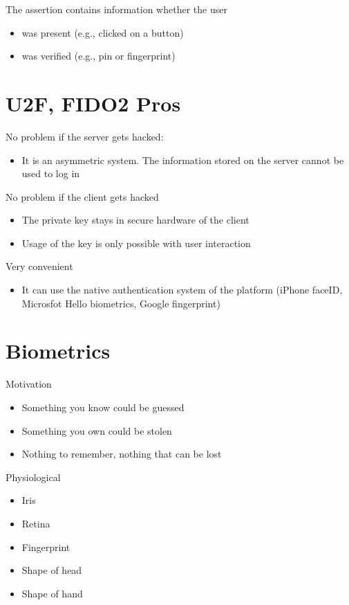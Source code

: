 \documentclass[11pt]{article}
\begin{document}
The assertion contains information whether the user

\begin{itemize}
	\item was present (e.g., clicked on a button)
	\item was verified (e.g., pin or fingerprint)
\end{itemize}

\section*{U2F, FIDO2 Pros}

No problem if the server gets hacked:

\begin{itemize}
	\item It is an asymmetric system. The information stored on the server cannot be used to log in
\end{itemize}

No problem if the client gets hacked 

\begin{itemize}
	\item The private key stays in secure hardware of the client
	\item Usage of the key is only possible with user interaction
\end{itemize}

Very convenient 
\begin{itemize}
	\item It can use the native authentication system of the platform (iPhone faceID, Microsfot Hello biometrics, Google fingerprint)
\end{itemize}


\section*{Biometrics}

Motivation
\begin{itemize}
	\item Something you know could be guessed
	\item Something you own could be stolen
	\item Nothing to remember, nothing that can be lost
\end{itemize}

Physiological 
\begin{itemize}
	\item Iris
	\item Retina
	\item Fingerprint
	\item Shape of head
	\item Shape of hand
\end{itemize}
\end{document}
